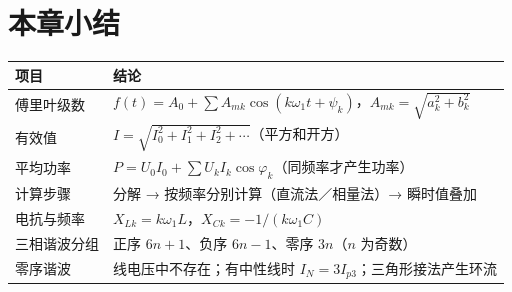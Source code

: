 
\section*{本章小结}
\begin{center}
\begin{tabular}{@{}p{}p{}@{}}
\toprule
项目 & 结论 \\
\midrule
傅里叶级数 & $f(t)=A_0+\sum A_{mk}\cos\left(k\omega_1t+\psi_k\right)$，$A_{mk}=\sqrt{a_k^2+b_k^2}$ \\
有效值 & $I=\sqrt{I_0^2+I_1^2+I_2^2+\cdots}$（平方和开方）\\
平均功率 & $P=U_0I_0+\sum U_kI_k\cos\varphi_k$（同频率才产生功率）\\
计算步骤 & 分解 → 按频率分别计算（直流法／相量法）→ 瞬时值叠加 \\
电抗与频率 & $X_{Lk}=k\omega_1L$，$X_{Ck}=-1/\left(k\omega_1C\right)$ \\
三相谐波分组 & 正序 $6n+1$、负序 $6n-1$、零序 $3n$（$n$ 为奇数）\\
零序谐波 & 线电压中不存在；有中性线时 $I_N=3I_{p3}$；三角形接法产生环流 \\
\bottomrule
\end{tabular}
\end{center}

\endinput
